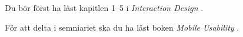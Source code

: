 Du bör först ha läst kapitlen 1--5 i \emph{Interaction Design} 
\citep{Sharp2011idb}.

För att delta i semniariet ska du ha läst boken \emph{Mobile Usability} 
\cite{Nielsen2013mu}.
